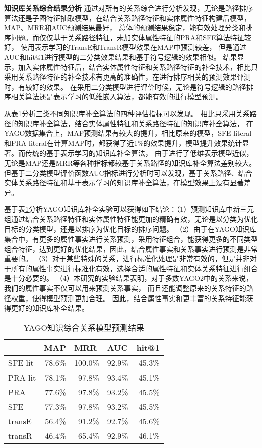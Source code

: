 \textbf{知识库关系综合结果分析} 通过对所有的关系综合进行分析发现，无论是路径排序算法还是子图特征抽取模型，在结合关系路径特征和实体属性特征构建后模型，MAP、MRR和AUC预测结果最好，
总体的预测结果稳定，能有效处理分类和排序问题。而仅仅基于关系路径特征，未加实体属性特征的PRA和SFE算法特征较好，
使用表示学习的TransE和TransR模型效果在MAP中预测较差，
但是通过AUC和hit@1进行模型的二分类效果结果和基于符号逻辑的效果相似。
结果显示，加入实体属性特征后，结合实体属性特征和关系路径特征的补全技术，相比只采用关系路径特征的补全技术有更高的准确性，在进行排序相关的预测效果评测时，有较好的效果。
在采用二分类模型进行评价时候，无论是符号逻辑的路径排序相关算法还是表示学习的低维嵌入算法，都能有效的进行模型预测。

从表\ref{tab:kbc-yago-literal}分析三类不同知识库补全算法的四种评估指标可以发现。
相比只采用关系路径的知识库补全算法，结合实体属性特征和关系路径特征的知识库补全算法，
在YAGO数据集合上，MAP预测结果有较大的提升，相比原来的模型，SFE-literal和PRA-literal在计算MAP时，都获得了近1\%的效果提升，模型提升效果统计显著。而传统的基于表示学习的知识库补全算法，
由于进行了低维表示模型近似，无论是MAP还是MRR等各种指标都较基于关系路径的知识库补全算法差别较大。但基于二分类模型评价函数AUC指标进行分析时可以发现，基于关系路径、结合实体关系路径特征和基于表示学习的知识库补全算法，在模型效果上没有显著差异。

基于表\ref{tab:kbc-yago-literal}分析YAGO知识库补全实验可以获得如下结论：（1）预测知识库中新三元组通过结合关系路径特征和实体属性特征能更加的精确有效，无论是以分类为优化目标的分类模型，还是以排序为优化目标的排序问题。
（2）由于在YAGO知识库集合中，有更多的属性事实进行关系预测，采用特征组合，能获得更多的不同类型组合特征，达到更好的优化结果，因此，结合属性事实和关系事实进行预测是非常重要的。
（3）对于某些特殊的关系，进行标准化处理是非常有效的，但是并非对于所有的属性事实进行标准化有效，选择合适的属性特征和实体关系特征进行组合是十分必要的。
（4）本研究的实验结果表明，对于多数YAGO2中的关系来说，我们的属性事实不仅可以用来预测关系事实，
而且还能调整原来的关系特征的路径权重，使得模型预测更加合理。
因此，结合属性事实和更丰富的关系特征能获得更好的知识库补全结果。
\begin{table}[H]
  \centering
  \caption{YAGO知识综合关系模型预测结果}
    \begin{tabular}{|l|r|r|r|r|}
    \hline
          & \multicolumn{1}{l|}{MAP} & \multicolumn{1}{l|}{MRR} & \multicolumn{1}{l|}{AUC} & \multicolumn{1}{l|}{hit@1} \\
    \hline
    SFE-lit & 78.6\% & 100.0\% & 92.9\% & 45.3\% \\
    \hline
    PRA-lit & 78.1\% & 97.8\% & 93.4\% & 45.1\% \\
    \hline
    PRA   & 77.6\% & 97.8\% & 93.2\% & 45.5\% \\
    \hline
    SFE   & 77.3\% & 97.8\% & 93.2\% & 45.5\% \\
    \hline
    transE & 56.4\% & 91.2\% & 92.7\% & 45.6\% \\
    \hline
    transR & 46.4\% & 65.4\% & 92.9\% & 46.1\% \\
    \hline
    \end{tabular}%
  \label{tab:kbc-yago-literal}%
\end{table}%


